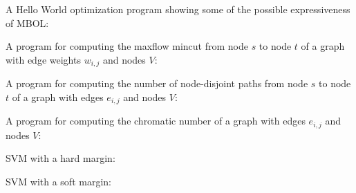 \documentclass{article}
\begin{document}
A Hello World optimization program showing some of the possible expressiveness of MBOL:


A program for computing the maxflow mincut from node $s$ to node $t$ of a graph with edge weights $w_{i,j}$ and nodes $V$:


A program for computing the number of node-disjoint paths from node $s$ to node $t$ of a graph with edges $e_{i,j}$ and nodes $V$:


A program for computing the chromatic number of a graph with edges $e_{i,j}$ and nodes $V$:


SVM with a hard margin:


SVM with a soft margin:

\end{document}
